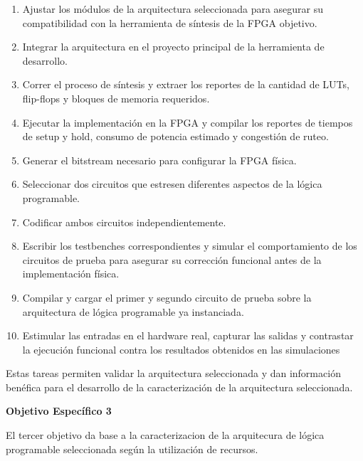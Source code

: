 \begin{enumerate}

    \item Ajustar los módulos de la arquitectura seleccionada para asegurar 
    su compatibilidad con la herramienta de síntesis de la FPGA objetivo.
    
    \item Integrar la arquitectura en el proyecto principal de la herramienta de desarrollo.
    
    \item Correr el proceso de síntesis y extraer los reportes de la cantidad de LUTs, 
    flip-flops y bloques de memoria requeridos.

    \item Ejecutar la implementación en la FPGA y compilar los reportes de tiempos 
     de setup y hold, consumo de potencia estimado y congestión de ruteo.

    \item Generar el bitstream necesario para configurar la FPGA física.
    
    \item Seleccionar dos circuitos que estresen diferentes aspectos de la lógica programable.
    
    \item Codificar ambos circuitos independientemente.
    
    \item Escribir los testbenches correspondientes y simular el comportamiento 
    de los circuitos de prueba para asegurar su corrección funcional antes de la 
    implementación física.

    \item Compilar y cargar el primer y segundo circuito de prueba sobre la 
    arquitectura de lógica programable ya instanciada.

    \item Estimular las entradas en el hardware real, capturar las salidas y contrastar la 
    ejecución funcional contra los resultados obtenidos en las simulaciones

\end{enumerate}

Estas tareas permiten validar la arquitectura seleccionada y dan información benéfica para 
el desarrollo de la caracterización de la arquitectura seleccionada.

\textbf{\normalsize{Objetivo Específico 3}}

El tercer objetivo da base a la caracterizacion de la arquitecura de lógica programable 
seleccionada según la utilización de recursos.

